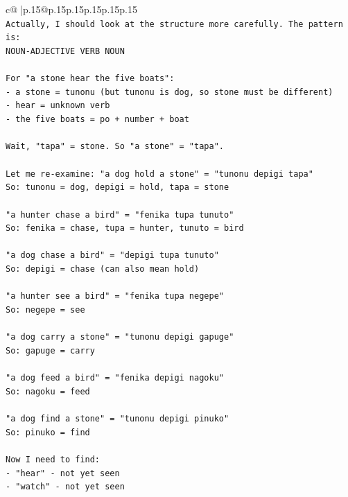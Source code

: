 \documentclass{article}
\begin{document}
{\begin{supertabular}{c@{$\;$}|p{.15\linewidth}@{}p{.15\linewidth}p{.15\linewidth}p{.15\linewidth}p{.15\linewidth}p{.15\linewidth}}
{{{\\ 
\texttt{Actually, I should look at the structure more carefully. The pattern is:} \\
\texttt{NOUN{-}ADJECTIVE VERB NOUN} \\
\\ 
\texttt{For "a stone hear the five boats":} \\
\texttt{{-} a stone = tunonu (but tunonu is dog, so stone must be different)} \\
\texttt{{-} hear = unknown verb} \\
\texttt{{-} the five boats = po + number + boat} \\
\\ 
\texttt{Wait, "tapa" = stone. So "a stone" = "tapa".} \\
\\ 
\texttt{Let me re{-}examine: "a dog hold a stone" = "tunonu depigi tapa"} \\
\texttt{So: tunonu = dog, depigi = hold, tapa = stone} \\
\\ 
\texttt{"a hunter chase a bird" = "fenika tupa tunuto"} \\
\texttt{So: fenika = chase, tupa = hunter, tunuto = bird} \\
\\ 
\texttt{"a dog chase a bird" = "depigi tupa tunuto"} \\
\texttt{So: depigi = chase (can also mean hold)} \\
\\ 
\texttt{"a hunter see a bird" = "fenika tupa negepe"} \\
\texttt{So: negepe = see} \\
\\ 
\texttt{"a dog carry a stone" = "tunonu depigi gapuge"} \\
\texttt{So: gapuge = carry} \\
\\ 
\texttt{"a dog feed a bird" = "fenika depigi nagoku"} \\
\texttt{So: nagoku = feed} \\
\\ 
\texttt{"a dog find a stone" = "tunonu depigi pinuko"} \\
\texttt{So: pinuko = find} \\
\\ 
\texttt{Now I need to find:} \\
\texttt{{-} "hear" {-} not yet seen} \\
\texttt{{-} "watch" {-} not yet seen} \\
}}}
\end{supertabular}}
\end{document}
